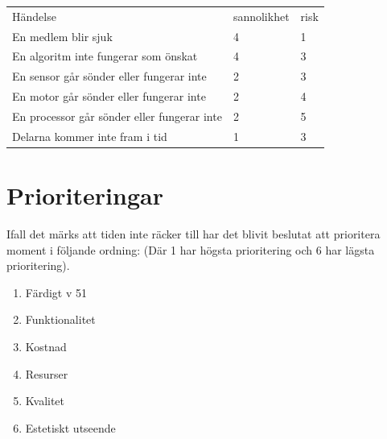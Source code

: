 \documentclass[a4paper,11pt]{article}
\begin{document}

\begin{tabular}{l l l}
	Händelse                                    & sannolikhet & risk \\
	En medlem blir sjuk                         & 4           & 1    \\
	En algoritm inte fungerar som önskat        & 4           & 3    \\
	En sensor går sönder eller fungerar inte    & 2           & 3    \\
	En motor går sönder eller fungerar inte     & 2           & 4    \\
	En processor går sönder eller fungerar inte & 2           & 5    \\
	Delarna kommer inte fram i tid              & 1           & 3
\end{tabular}



\section{Prioriteringar}
Ifall det märks att tiden inte räcker till har det blivit beslutat att prioritera moment i följande ordning: (Där 1 har högsta prioritering och 6 har lägsta prioritering).

\begin{enumerate}
        \item Färdigt v 51
        \item Funktionalitet %
        \item Kostnad %
        \item Resurser %
        \item Kvalitet %
        \item Estetiskt utseende
    \end{enumerate}
    
\end{document}
